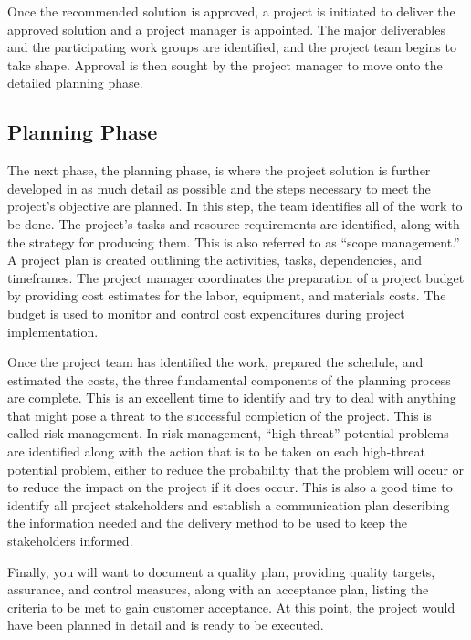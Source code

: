 \documentclass[18 pt]{article}
\begin{document}
\begin{large}
Once the recommended solution is approved, a project is initiated to deliver the approved solution and a project manager is appointed. The major deliverables and the participating work groups are identified, and the project team begins to take shape. Approval is then sought by the project manager to move onto the detailed planning phase.
\subsection{Planning Phase}
The next phase, the planning phase, is where the project solution is further developed in as much detail as possible and the steps necessary to meet the project’s objective are planned. In this step, the team identifies all of the work to be done. The project’s tasks and resource requirements are identified, along with the strategy for producing them. This is also referred to as “scope management.” A project plan is created outlining the activities, tasks, dependencies, and timeframes. The project manager coordinates the preparation of a project budget by providing cost estimates for the labor, equipment, and materials costs. The budget is used to monitor and control cost expenditures during project implementation.


Once the project team has identified the work, prepared the schedule, and estimated the costs, the three fundamental components of the planning process are complete. This is an excellent time to identify and try to deal with anything that might pose a threat to the successful completion of the project. This is called risk management. In risk management, “high-threat” potential problems are identified along with the action that is to be taken on each high-threat potential problem, either to reduce the probability that the problem will occur or to reduce the impact on the project if it does occur. This is also a good time to identify all project stakeholders and establish a communication plan describing the information needed and the delivery method to be used to keep the stakeholders informed.


Finally, you will want to document a quality plan, providing quality targets, assurance, and control measures, along with an acceptance plan, listing the criteria to be met to gain customer acceptance. At this point, the project would have been planned in detail and is ready to be executed.



\end{large}
\end{document}
